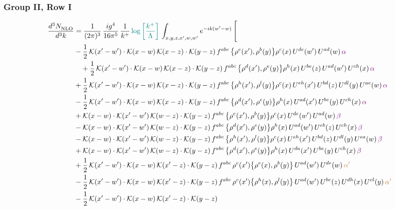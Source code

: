 \documentclass[9pt]{article}
\numberwithin{equation}{section}
\begin{document}
\subsubsection{Group II, Row I}
\begin{align}
     \frac{d^{3}N_{\rm NLO}^{\rm}}{d^{3}k}  & = \frac{1}{(2\pi)^{3}}\, \frac{ig^{4}}{16\pi^{5}}\, \frac{1}{k^{+}}\, {\color{teal}\log{\left[\frac{k^{+}}{\Lambda}\right]}}\, \int_{x,y,z,x^{\prime},w,w^{\prime}}e^{-ik(w^{\prime}-w)}\, \Bigg[\notag \\ & -\frac{1}{2}\,\mathcal{K}(x'-w')\cdot\mathcal{K}(x-w)\,\mathcal{K}(x-z)\cdot\mathcal{K}(y-z)\, f^{abc}\,\big\{\rho^{e}(x'),\rho^{b}(y)\big\}\rho^{c}(x)\,U^{de}(w')\,U^{ad}(w)\,{\color{violet}\alpha}\notag \\ &\quad+\frac{1}{2}\,\mathcal{K}(x'-w')\cdot\mathcal{K}(x-w)\,\mathcal{K}(x-z)\cdot\mathcal{K}(y-z)\, f^{abc}\,\big\{\rho^{d}(x'),\rho^{e}(y)\big\}\rho^{h}(x)\,U^{be}(z)\,U^{ad}(w')\,U^{ch}(x)\,{\color{violet}\alpha}\notag\\ & +\frac{1}{2}\,\mathcal{K}(x'-w')\cdot\mathcal{K}(x-w)\,\mathcal{K}(x-z)\cdot\mathcal{K}(y-z)\, f^{abc}\,\big\{\rho^{h}(x'),\rho^{l}(y)\big\}\rho^{c}(x)\,U^{eh}(x')\,U^{bd}(z)\,U^{dl}(y)\,U^{ae}(w)\,{\color{violet}\alpha}\notag \\ &-\frac{1}{2}\,\mathcal{K}(x'-w')\cdot\mathcal{K}(x-w)\,\mathcal{K}(x-z)\cdot\mathcal{K}(y-z)\, f^{abc}\,\big\{\rho^{d}(x'),\rho^{e}(y)\big\}\rho^{h}(x)\,U^{ad}(x')\,U^{be}(y)\,U^{ch}(x)\,{\color{violet}\alpha}\notag\\ &+\mathcal{K}(x-w)\cdot\mathcal{K}(x'-w')\,\mathcal{K}(w-z)\cdot\mathcal{K}(y-z)\, f^{abc}\,\big\{\rho^{e}(x'),\rho^{b}(y)\big\}\rho^{c}(x)\,U^{de}(w')\,U^{ad}(w)\,{\color{violet}\beta}\notag\\ &-\mathcal{K}(x-w)\cdot\mathcal{K}(x'-w')\,\mathcal{K}(w-z)\cdot\mathcal{K}(y-z)\, f^{abc}\,\big\{\rho^{d}(x'),\rho^{e}(y)\big\}\rho^{h}(x)\,U^{ad}(w')\,U^{eb}(z)\,U^{ch}(x)\,{\color{violet}\beta}\notag \\ &-\mathcal{K}(x-w)\cdot\mathcal{K}(x'-w')\,\mathcal{K}(w-z)\cdot\mathcal{K}(y-z)\, f^{abc}\,\big\{\rho^{h}(x'),\rho^{l}(y)\big\}\rho^{c}(x)\,U^{eh}(x')\,U^{bd}(z)\,U^{dl}(y)\,U^{ea}(w)\,{\color{violet}\beta}\notag \\ & +\mathcal{K}(x-w)\cdot\mathcal{K}(x'-w')\,\mathcal{K}(w-z)\cdot\mathcal{K}(y-z)\, f^{abc}\,\big\{\rho^{d}(x'),\rho^{e}(y)\big\}\rho^{h}(x)\,U^{da}(x')\,U^{be}(y)\,U^{ch}(x)\,{\color{violet}\beta}\notag \\ &+\frac{1}{2}\,\mathcal{K}(x'-w')\cdot\mathcal{K}(x-w)\,\mathcal{K}(x'-z)\cdot\mathcal{K}(y-z)\, f^{abc}\,\rho^{c}(x')\big\{\rho^{e}(x),\rho^{b}(y)\big\}\,U^{ad}(w')\,U^{de}(w)\,{\color{brown}\alpha'}\notag \\ &-\frac{1}{2}\,\mathcal{K}(x'-w')\cdot\mathcal{K}(x-w)\,\mathcal{K}(x'-z)\cdot\mathcal{K}(y-z)\, f^{abc}\,\rho^{c}(x')\big\{\rho^{h}(x),\rho^{l}(y)\big\}\,U^{ad}(w')\,U^{be}(z)\,U^{dh}(x)\,U^{el}(y)\,{\color{brown}\alpha'}\notag \\ &-\frac{1}{2}\,\mathcal{K}(x'-w')\cdot\mathcal{K}(x-w)\,\mathcal{K}(x'-z)\cdot\mathcal{K}(y-z)\, 
\end{align}
\end{document}
